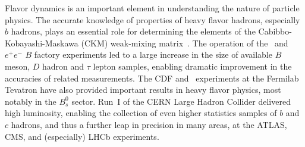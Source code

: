 %

\label{sec:intro}

Flavor dynamics is an important element in understanding the nature of
particle physics.  The accurate knowledge of properties of heavy flavor
hadrons, especially $b$ hadrons, plays an essential role for
determining the elements of the Cabibbo-Kobayashi-Maskawa (CKM)
weak-mixing matrix~\cite{Cabibbo:1963yz,Kobayashi:1973fv}. 
The operation of the \belle\ and \babar\ $e^+e^-$ $B$ factory 
experiments led to a large increase in the size of available 
$B$ meson, $D$ hadron and $\tau$ lepton samples, 
enabling dramatic improvement in the accuracies of related measurements.
The CDF and \dzero\ experiments at the Fermilab Tevatron 
have also provided important results in heavy flavor physics,
most notably in the $B^0_s$ sector.
Run~I of the CERN Large Hadron Collider delivered high luminosity, 
enabling the collection of even higher statistics samples of $b$ 
and $c$ hadrons, and thus a further leap in precision in many areas, at the
ATLAS, CMS, and (especially) LHCb experiments. 
 
